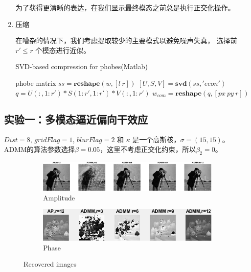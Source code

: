 \documentclass[12pt]{article}
\begin{document}
\begin{enumerate}
\begin{algorithm}
	\end{algorithm}
	为了获得更清晰的表达，在我们显示最终模态之前总是执行正交化操作。 
	
	\item 压缩
	
在嘈杂的情况下，我们考虑提取较少的主要模式以避免噪声失真， 选择前 $r'\leq r$ 个模态进行近似。

	\begin{algorithm}
		\caption{SVD-based compression for phobes(Matlab)}
		\label{alg:compression}
		phobe matrix $ss = \textbf{reshape}(w,[l\ r])$ \;
		$[U,S,V] = \textbf{svd}(ss,'econ')$ \;
		$q = U(:,1:r')*S(1:r',1:r')*V(:,1:r')$ \;
		$w_{com} = \textbf{reshape}(q,[px \ py \  r])$ \;
		
	\end{algorithm}
\end{enumerate}

\subsection{实验一：多模态逼近偏向干效应}
$Dist=8$, $gridFlag=1$, $blurFlag=2$ 和 $\kappa$ 是一个高斯核，$\sigma = (15,15)$。 ADMM的算法参数选择$\beta=0.05$，这里不考虑正交化约束，所以$\beta_2 = 0$。



\begin{figure}
	\centering
	
	\begin{subfigure}{1\textwidth}
		\centering
		\includegraphics[width=0.9\linewidth]{../figures/modes_u.eps}  
		\caption{Amplitude}
		\label{fig:modes_u}
	\end{subfigure}
	\begin{subfigure}{1\textwidth}
		\centering
		\includegraphics[width=.9\linewidth]{../figures/modes_u_phaze.png}  
		\caption{Phase}
		\label{fig:modes_u_phaze}
	\end{subfigure}
	
	\label{fig:modes_images}
	\caption{Recovered images}
\end{figure}
\end{document}
